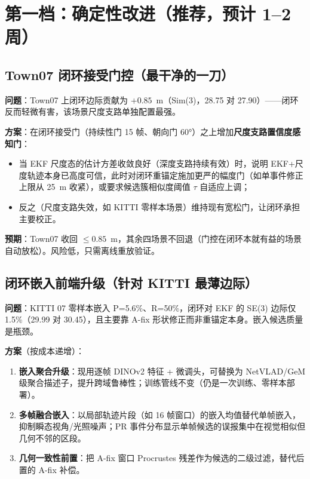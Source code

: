 \documentclass[11pt]{article}
\begin{document}
\section{第一档：确定性改进（推荐，预计 1--2 周）}

\subsection{Town07 闭环接受门控（最干净的一刀）}

\textbf{问题}：Town07 上闭环边际贡献为 $+0.85$~m（Sim(3)，28.75 对 27.90）——闭环反而轻微有害，该场景尺度支路单独配置最强。

\textbf{方案}：在闭环接受门（持续性门 15 帧、朝向门 60°）之上增加\textbf{尺度支路置信度感知门}：
\begin{itemize}[nosep]
  \item 当 EKF 尺度态的估计方差收敛良好（深度支路持续有效）时，说明 EKF+尺度轨迹本身已高度可信，此时对闭环重锚定施加更严的幅度门（如单事件修正上限从 25~m 收紧），或要求候选簇相似度阈值 $\tau$ 自适应上调；
  \item 反之（尺度支路失效，如 KITTI 零样本场景）维持现有宽松门，让闭环承担主要校正。
\end{itemize}

\textbf{预期}：Town07 收回 $\le 0.85$~m，其余四场景不回退（门控在闭环本就有益的场景自动放松）。风险低，只需离线重放验证。

\subsection{闭环嵌入前端升级（针对 KITTI 最薄边际）}

\textbf{问题}：KITTI 07 零样本嵌入 P=5.6\%、R=50\%，闭环对 EKF 的 SE(3) 边际仅 1.5\%（29.99 对 30.45），且主要靠 A-fix 形状修正而非重锚定本身。嵌入候选质量是瓶颈。

\textbf{方案}（按成本递增）：
\begin{enumerate}[nosep]
  \item \textbf{嵌入聚合升级}：现用逐帧 DINOv2 特征 + 微调头，可替换为 NetVLAD/GeM 级聚合描述子，提升跨域鲁棒性；训练管线不变（仍是一次训练、零样本部署）。
  \item \textbf{多帧融合嵌入}：以局部轨迹片段（如 16 帧窗口）的嵌入均值替代单帧嵌入，抑制瞬态视角/光照噪声；PR 事件分布显示单帧候选的误报集中在视觉相似但几何不邻的区段。
  \item \textbf{几何一致性前置}：把 A-fix 窗口 Procrustes 残差作为候选的二级过滤，替代后置的 A-fix 补偿。
\end{enumerate}
\end{document}
